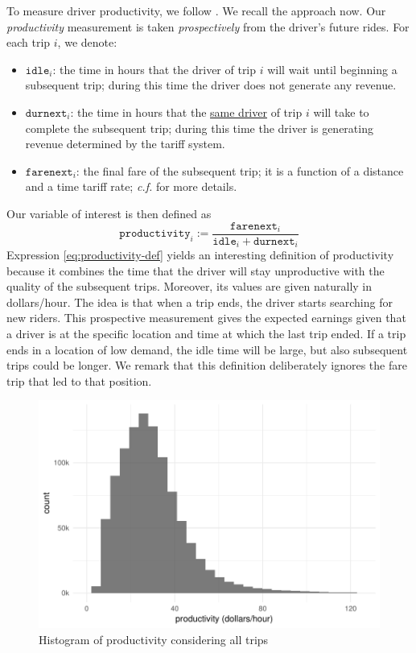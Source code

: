 \documentclass[a4paper, 11pt]{article}
\begin{document}
To measure driver productivity, we follow \citet{zuniga-etal-2019}. We recall the approach now. Our \textit{productivity} measurement is taken \textit{prospectively} from the driver's future rides. For each trip $i$, we denote:
\begin{itemize}\itemsep0em 
    \item $\mathtt{idle}_i$: the time in hours that the driver of trip $i$ will wait until beginning a subsequent trip; during this time the driver does not generate any revenue.
    \item $\mathtt{durnext}_i$: the time in hours that the \underline{same driver} of trip $i$ will take to complete the subsequent trip; during this time the driver is generating revenue determined by the tariff system.
    \item $\mathtt{farenext}_i$: the final fare of the subsequent trip; it is a function of a distance and a time tariff rate; \textit{c.f.} \citep{zuniga-etal-2018} for more details.
\end{itemize}

Our variable of interest is then defined as 
\begin{equation}
    \label{eq:productivity-def}
    \mathtt{productivity}_i := \frac{\mathtt{farenext}_i}{\mathtt{idle}_i + \mathtt{durnext}_i}
\end{equation}
Expression \eqref{eq:productivity-def} yields an interesting definition of productivity because it combines the time that the driver will stay unproductive with the quality of the subsequent trips. Moreover, its values are given naturally in dollars/hour. The idea is that when a trip ends, the driver starts searching for new riders. This prospective measurement gives the expected earnings given that a driver is at the specific location and time at which the last trip ended. If a trip ends in a location of low demand, the idle time will be large, but also subsequent trips could be longer. We remark that this definition deliberately ignores the fare trip that led to that position.

\begin{figure}[tb]
    \centering
    \includegraphics[width=0.65\linewidth]{img/prodhist_global.pdf}
    \caption{Histogram of productivity considering all trips}
    \label{fig:prodhist}
\end{figure}
\end{document}
